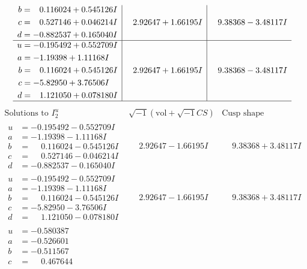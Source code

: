 \documentclass[1p]{elsarticle_modified}
\theoremstyle{definition}
\newcommand{\I}{\sqrt{-1}}
\begin{document}
$$\begin{array}{c|c|c}
\begin{aligned}
b &= \phantom{-}0.116024 + 0.545126 I \\
c &= \phantom{-}0.527146 + 0.046214 I \\
d &= -0.882537 + 0.165040 I\end{aligned}
 & \phantom{-}2.92647 + 1.66195 I & \phantom{-}9.38368 - 3.48117 I \\ \hline\begin{aligned}
u &= -0.195492 + 0.552709 I \\
a &= -1.19398 + 1.11168 I \\
b &= \phantom{-}0.116024 + 0.545126 I \\
c &= -5.82950 + 3.76506 I \\
d &= \phantom{-}1.121050 + 0.078180 I\end{aligned}
 & \phantom{-}2.92647 + 1.66195 I & \phantom{-}9.38368 - 3.48117 I\\
 \hline 
 \end{array}$$\newpage$$\begin{array}{c|c|c}  
\text{Solutions to }I^u_{2}& \I (\text{vol} + \sqrt{-1}CS) & \text{Cusp shape}\\
 \hline 
\begin{aligned}
u &= -0.195492 - 0.552709 I \\
a &= -1.19398 - 1.11168 I \\
b &= \phantom{-}0.116024 - 0.545126 I \\
c &= \phantom{-}0.527146 - 0.046214 I \\
d &= -0.882537 - 0.165040 I\end{aligned}
 & \phantom{-}2.92647 - 1.66195 I & \phantom{-}9.38368 + 3.48117 I \\ \hline\begin{aligned}
u &= -0.195492 - 0.552709 I \\
a &= -1.19398 - 1.11168 I \\
b &= \phantom{-}0.116024 - 0.545126 I \\
c &= -5.82950 - 3.76506 I \\
d &= \phantom{-}1.121050 - 0.078180 I\end{aligned}
 & \phantom{-}2.92647 - 1.66195 I & \phantom{-}9.38368 + 3.48117 I \\ \hline\begin{aligned}
u &= -0.580387\phantom{ +0.000000I} \\
a &= -0.526601\phantom{ +0.000000I} \\
b &= -0.511567\phantom{ +0.000000I} \\
c &= \phantom{-}0.467644\phantom{ +0.000000I} \\

\end{aligned}
\end{array}$$
\end{document}
